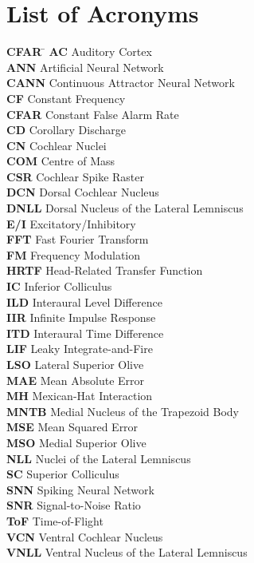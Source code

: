
\chapter*{List of Acronyms}

\begin{tabbing}
    \textbf{CFAR} \qquad \= \kill
    \textbf{AC} \> Auditory Cortex \\
    \textbf{ANN} \> Artificial Neural Network \\
    \textbf{CANN} \> Continuous Attractor Neural Network \\
    \textbf{CF} \> Constant Frequency \\
    \textbf{CFAR} \> Constant False Alarm Rate \\
    \textbf{CD} \> Corollary Discharge \\
    \textbf{CN} \> Cochlear Nuclei \\
    \textbf{COM} \> Centre of Mass \\
    \textbf{CSR} \> Cochlear Spike Raster \\
    \textbf{DCN} \> Dorsal Cochlear Nucleus \\
    \textbf{DNLL} \> Dorsal Nucleus of the Lateral Lemniscus \\
    \textbf{E/I} \> Excitatory/Inhibitory \\
    \textbf{FFT} \> Fast Fourier Transform \\
    \textbf{FM} \> Frequency Modulation \\
    \textbf{HRTF} \> Head-Related Transfer Function \\
    \textbf{IC} \> Inferior Colliculus \\
    \textbf{ILD} \> Interaural Level Difference \\
    \textbf{IIR} \> Infinite Impulse Response \\
    \textbf{ITD} \> Interaural Time Difference \\
    \textbf{LIF} \> Leaky Integrate-and-Fire \\
    \textbf{LSO} \> Lateral Superior Olive \\
    \textbf{MAE} \> Mean Absolute Error \\
    \textbf{MH} \> Mexican-Hat Interaction \\
    \textbf{MNTB} \> Medial Nucleus of the Trapezoid Body \\
    \textbf{MSE} \> Mean Squared Error \\
    \textbf{MSO} \> Medial Superior Olive \\
    \textbf{NLL} \> Nuclei of the Lateral Lemniscus \\
    \textbf{SC} \> Superior Colliculus \\
    \textbf{SNN} \> Spiking Neural Network \\
    \textbf{SNR} \> Signal-to-Noise Ratio \\
    \textbf{ToF} \> Time-of-Flight \\
    \textbf{VCN} \> Ventral Cochlear Nucleus \\
    \textbf{VNLL} \> Ventral Nucleus of the Lateral Lemniscus
\end{tabbing}
